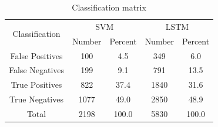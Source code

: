 \begin{table}[ht!]
\centering
\begin{tabular}{||c||c c| c c||}  
 \hline
 \multirow{2}{*}{Classification} &
       \multicolumn{2}{c|}{SVM} &
       \multicolumn{2}{c||}{LSTM} \\
 & Number & Percent & Number & Percent \\ [0.5ex] 
 \hline\hline
 False Positives & 100 & 4.5 & 349 & 6.0 \\ \hline
 False Negatives & 199 & 9.1 & 791 & 13.5 \\ \hline
 True Positives & 822 & 37.4 & 1840 & 31.6 \\ \hline
 True Negatives & 1077 & 49.0 & 2850 & 48.9 \\ \hline\hline
 Total & 2198 & 100.0 & 5830 & 100.0 \\ \hline
\end{tabular}
\caption{Classification matrix}
\label{table_svm_outputs}
\end{table}


